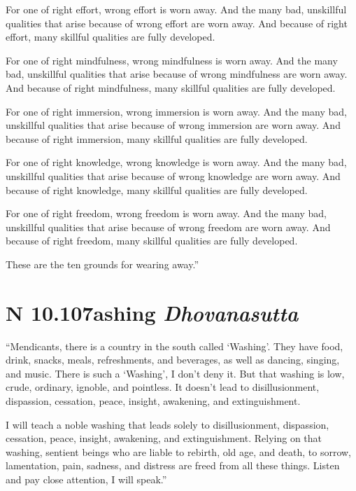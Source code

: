 \documentclass[12pt,openany]{book}%
\newcommand*{\suttatitleacronym}[1]{\smaller[2]{#1}\vspace*{.3em}}
\newcommand*{\suttatitletranslation}[1]{\linebreak{#1}}
\newcommand*{\suttatitleroot}[1]{\linebreak\smaller[2]\itshape{#1}}
\newcommand*{\tocacronym}[1]{\hspace*{-3.3em}{#1}\quad}
\newcommand*{\toctranslation}[1]{#1}
\newcommand*{\tocroot}[1]{(\textit{#1})}
\begin{document}
For one of right effort, wrong effort is worn away. And the many bad, unskillful qualities that arise because of wrong effort are worn away. And because of right effort, many skillful qualities are fully developed. 

For one of right mindfulness, wrong mindfulness is worn away. And the many bad, unskillful qualities that arise because of wrong mindfulness are worn away. And because of right mindfulness, many skillful qualities are fully developed. 

For one of right immersion, wrong immersion is worn away. And the many bad, unskillful qualities that arise because of wrong immersion are worn away. And because of right immersion, many skillful qualities are fully developed. 

For one of right knowledge, wrong knowledge is worn away. And the many bad, unskillful qualities that arise because of wrong knowledge are worn away. And because of right knowledge, many skillful qualities are fully developed. 

For one of right freedom, wrong freedom is worn away. And the many bad, unskillful qualities that arise because of wrong freedom are worn away. And because of right freedom, many skillful qualities are fully developed. 

These are the ten grounds for wearing away.” 

%
\section*{{\suttatitleacronym AN 10.107}{\suttatitletranslation Washing }{\suttatitleroot Dhovanasutta}}
\addcontentsline{toc}{section}{\tocacronym{AN 10.107} \toctranslation{Washing } \tocroot{Dhovanasutta}}

“Mendicants, there is a country in the south called ‘Washing’. They have food, drink, snacks, meals, refreshments, and beverages, as well as dancing, singing, and music. There is such a ‘Washing’, I don’t deny it. But that washing is low, crude, ordinary, ignoble, and pointless. It doesn’t lead to disillusionment, dispassion, cessation, peace, insight, awakening, and extinguishment. 

I will teach a noble washing that leads solely to disillusionment, dispassion, cessation, peace, insight, awakening, and extinguishment. Relying on that washing, sentient beings who are liable to rebirth, old age, and death, to sorrow, lamentation, pain, sadness, and distress are freed from all these things. Listen and pay close attention, I will speak.” 
\end{document}
